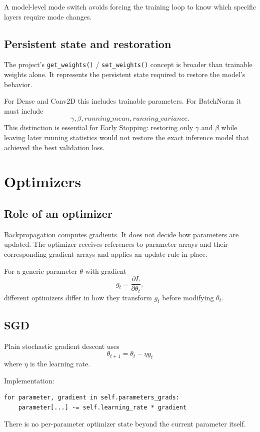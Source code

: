 \documentclass[11pt,a4paper]{article}
\newcommand{\pd}[2]{\frac{\partial #1}{\partial #2}}
\newcommand{\code}[1]{\texttt{#1}}
\begin{document}
A model-level mode switch avoids forcing the training loop to know which specific layers require mode changes.

\subsection{Persistent state and restoration}

The project's \code{get\_weights()} / \code{set\_weights()} concept is broader than trainable weights alone. It represents the persistent state required to restore the model's behavior.

For Dense and Conv2D this includes trainable parameters. For BatchNorm it must include
\[
\gamma,\beta,running\_mean,running\_variance.
\]
This distinction is essential for Early Stopping: restoring only $\gamma$ and $\beta$ while leaving later running statistics would not restore the exact inference model that achieved the best validation loss.

\section{Optimizers}

\subsection{Role of an optimizer}

Backpropagation computes gradients. It does not decide how parameters are updated. The optimizer receives references to parameter arrays and their corresponding gradient arrays and applies an update rule in place.

For a generic parameter $\theta$ with gradient
\[
g_t=\pd{L}{\theta_t},
\]
different optimizers differ in how they transform $g_t$ before modifying $\theta_t$.

\subsection{SGD}

Plain stochastic gradient descent uses
\[
\boxed{
\theta_{t+1}=\theta_t-\eta g_t
}
\]
where $\eta$ is the learning rate.

Implementation:
\begin{lstlisting}
for parameter, gradient in self.parameters_grads:
    parameter[...] -= self.learning_rate * gradient
\end{lstlisting}

There is no per-parameter optimizer state beyond the current parameter itself.
\end{document}
